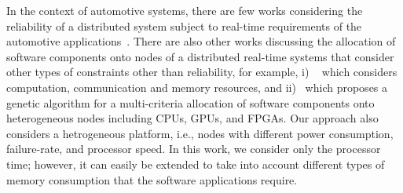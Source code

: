 In the context of automotive systems, there are few works considering the reliability of a distributed system subject to real-time requirements of the automotive applications~\cite{islam2006dependability}\cite{kim2011autosar}. There are also other works discussing the allocation of software components onto nodes of a distributed real-time systems that consider other types of constraints other than reliability, for example, i) ~\cite{wang2004component} which considers computation, communication and memory resources, and ii)~\cite{vsvogor2014extended} which proposes a genetic algorithm for a multi-criteria allocation of software components onto heterogeneous nodes including CPUs, GPUs, and FPGAs. Our approach also considers a hetrogeneous platform, i.e., nodes with different power consumption, failure-rate, and processor speed. In this work, we consider only the processor time; however, it can easily be extended to take into account different types of memory consumption that the software applications require.
